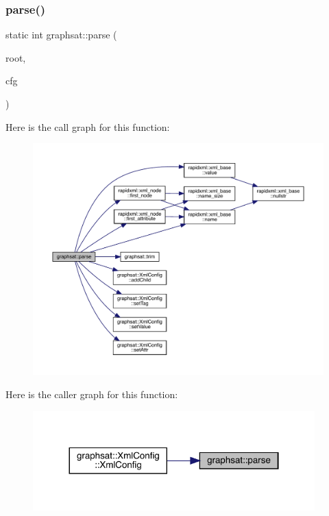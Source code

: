\subsubsection{\texorpdfstring{parse()}{parse()}}
{\footnotesize\ttfamily static int graphsat\+::parse (\begin{DoxyParamCaption}\item[{\mbox{\hyperlink{classrapidxml_1_1xml__node}{xml\+\_\+node}}$<$$>$ $\ast$}]{root,  }\item[{\mbox{\hyperlink{classgraphsat_1_1_xml_config}{Xml\+Config}} $\ast$}]{cfg }\end{DoxyParamCaption})\hspace{0.3cm}{\ttfamily [static]}}

Here is the call graph for this function\+:
\nopagebreak
\begin{figure}[H]
\begin{center}
\leavevmode
\includegraphics[width=350pt]{namespacegraphsat_a52f57679c1c2524761f4c398da1d9946_cgraph}
\end{center}
\end{figure}
Here is the caller graph for this function\+:
\nopagebreak
\begin{figure}[H]
\begin{center}
\leavevmode
\includegraphics[width=308pt]{namespacegraphsat_a52f57679c1c2524761f4c398da1d9946_icgraph}
\end{center}
\end{figure}
\mbox{\label{namespacegraphsat_a7fe53bf89583dc8ec90c6669b17f8b6d}} 
